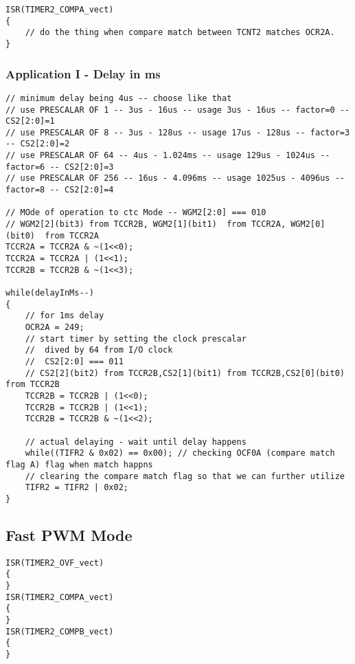 \documentclass{article}
\begin{document}
\begin{verbatim}
ISR(TIMER2_COMPA_vect)
{
    // do the thing when compare match between TCNT2 matches OCR2A.
}
\end{verbatim}



\subsubsection{Application I - Delay in ms}

\begin{verbatim}
// minimum delay being 4us -- choose like that
// use PRESCALAR OF 1 -- 3us - 16us -- usage 3us - 16us -- factor=0 -- CS2[2:0]=1
// use PRESCALAR OF 8 -- 3us - 128us -- usage 17us - 128us -- factor=3 -- CS2[2:0]=2
// use PRESCALAR OF 64 -- 4us - 1.024ms -- usage 129us - 1024us -- factor=6 -- CS2[2:0]=3
// use PRESCALAR OF 256 -- 16us - 4.096ms -- usage 1025us - 4096us -- factor=8 -- CS2[2:0]=4
    
// MOde of operation to ctc Mode -- WGM2[2:0] === 010
// WGM2[2](bit3) from TCCR2B, WGM2[1](bit1)  from TCCR2A, WGM2[0](bit0)  from TCCR2A
TCCR2A = TCCR2A & ~(1<<0);
TCCR2A = TCCR2A | (1<<1);
TCCR2B = TCCR2B & ~(1<<3);

while(delayInMs--)
{
    // for 1ms delay
    OCR2A = 249;
    // start timer by setting the clock prescalar
    //  dived by 64 from I/O clock
    //  CS2[2:0] === 011
    // CS2[2](bit2) from TCCR2B,CS2[1](bit1) from TCCR2B,CS2[0](bit0) from TCCR2B
    TCCR2B = TCCR2B | (1<<0);
    TCCR2B = TCCR2B | (1<<1);
    TCCR2B = TCCR2B & ~(1<<2);

    // actual delaying - wait until delay happens
    while((TIFR2 & 0x02) == 0x00); // checking OCF0A (compare match flag A) flag when match happns
    // clearing the compare match flag so that we can further utilize
    TIFR2 = TIFR2 | 0x02;
}
\end{verbatim}

\subsection{Fast PWM Mode}
\begin{verbatim}
ISR(TIMER2_OVF_vect)
{
} 
ISR(TIMER2_COMPA_vect)
{
}
ISR(TIMER2_COMPB_vect)
{
}
\end{verbatim}
\end{document}

